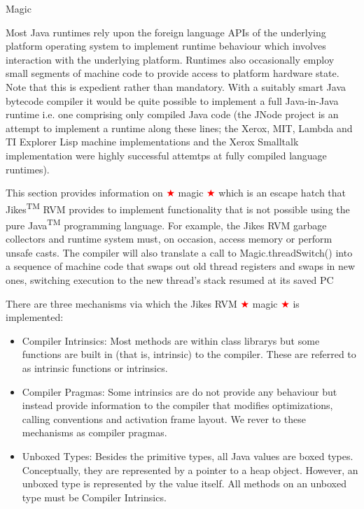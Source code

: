 \begin{section}{Magic}
\label{sec:magic}

Most Java runtimes rely upon the foreign language APIs of the underlying platform operating system to implement runtime behaviour which involves interaction with the underlying platform. Runtimes also occasionally employ small segments of machine code to provide access to platform hardware state. Note that this is expedient rather than mandatory. With a suitably smart Java bytecode compiler it would be quite possible to implement a full Java-in-Java runtime i.e. one comprising only compiled Java code (the JNode project is an attempt to implement a runtime along these lines; the Xerox, MIT, Lambda and TI Explorer Lisp machine implementations and the Xerox Smalltalk implementation were highly successful attemtps at fully compiled language runtimes).

This section provides information on \textcolor{red}{$\bigstar$} magic \textcolor{red}{$\bigstar$} which is an escape hatch that Jikes\textsuperscript{TM} RVM provides to implement functionality that is not possible using the pure Java\textsuperscript{TM} programming language. For example, the Jikes RVM garbage collectors and runtime system must, on occasion, access memory or perform unsafe casts. The compiler will also translate a call to Magic.threadSwitch() into a sequence of machine code that swaps out old thread registers and swaps in new ones, switching execution to the new thread's stack resumed at its saved PC

There are three mechanisms via which the Jikes RVM \textcolor{red}{$\bigstar$} magic \textcolor{red}{$\bigstar$} is implemented:
\begin{itemize}
  \item Compiler Intrinsics: Most methods are within class librarys but some functions are built in (that is, intrinsic) to the compiler. These are referred to as intrinsic functions or intrinsics.
  \item Compiler Pragmas: Some intrinsics are do not provide any behaviour but instead provide information to the compiler that modifies optimizations, calling conventions and activation frame layout. We rever to these mechanisms as compiler pragmas.
  \item Unboxed Types: Besides the primitive types, all Java values are boxed types. Conceptually, they are represented by a pointer to a heap object. However, an unboxed type is represented by the value itself. All methods on an unboxed type must be Compiler Intrinsics.
\end{itemize}


\end{section}
